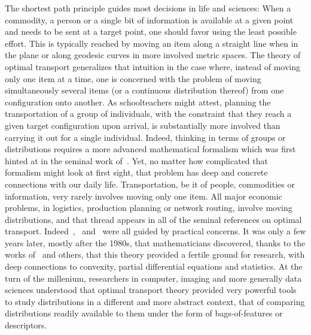 The shortest path principle guides most decisions in life and sciences: When a commodity, a person or a single bit of information is available at a given point and needs to be sent at a target point, one should favor using the least possible effort. This is typically reached by moving an item along a straight line when in the plane or along geodesic curves in more involved metric spaces. The theory of optimal transport generalizes that intuition in the case where, instead of moving only one item at a time, one is concerned with the problem of moving simultaneously several items (or a continuous distribution thereof) from one configuration onto another. As schoolteachers might attest, planning the transportation of a group of individuals, with the constraint that they reach a given target configuration upon arrival, is substantially more involved than carrying it out for a single individual. Indeed, thinking in terms of groups or distributions requires a more advanced mathematical formalism which was first hinted at in the seminal work of~\citet{Monge1781}. Yet, no matter how complicated that formalism might look at first sight, that problem has deep and concrete connections with our daily life. Transportation, be it of people, commodities or information, very rarely involves moving only one item. All major economic problems, in logistics, production planning or network routing, involve moving distributions, and that thread appears in all of the seminal references on optimal transport. Indeed~\citet{tolstoi1930methods},~\citet{Hitchcock41} and~\citet{Kantorovich42} were all guided by practical concerns. It was only a few years later, mostly after the 1980s, that mathematicians discovered, thanks to the works of~\citet{Brenier91} and others, that this theory provided a fertile ground for research, with deep connections to convexity, partial differential equations and  statistics. At the turn of the millenium, researchers in computer, imaging and more generally data sciences understood that optimal transport theory provided very powerful tools to study distributions in a different and more abstract context, that of comparing distributions readily available to them under the form of bags-of-features or descriptors.
%

